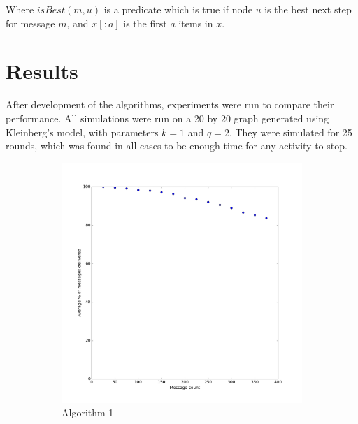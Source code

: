 \documentclass[bsc,frontabs,twoside,singlespacing,parskip,deptreport]{infthesis}     %
\begin{document}
Where $isBest(m, u)$ is a predicate which is true if node $u$ is the best next step for message $m$, and $x[:a]$ is the first $a$ items in $x$.


\chapter{Results}
After development of the algorithms, experiments were run to compare their performance. All simulations were run on a 20 by 20 graph generated using Kleinberg's model, with parameters $k = 1$ and $q = 2$. They were simulated for 25 rounds, which was found in all cases to be enough time for any activity to stop. 

\begin{figure}
  	\vspace{-25pt}
    \centering
    \begin{subfigure}[b]{0.3\textwidth}
        \includegraphics[width=\textwidth]{results/BasicShare_Prob0}
        \caption{Algorithm 1}
        \label{fig:results/BasicShare_Prob0}
    \end{subfigure}
    ~ %
    \begin{subfigure}[b]{0.3\textwidth}

\end{subfigure}
\end{figure}
\end{document}
